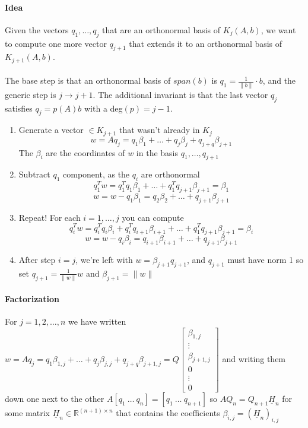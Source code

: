 \documentclass[10pt]{report}
\begin{document}
\paragraph{Idea} Given the vectors $q_1,\ldots,q_j$ that are an orthonormal basis of $K_j(A,b)$, we want to compute one more vector $q_{j+1}$ that extends it to an orthonormal basis of $K_{j+1}(A,b)$.\\\\
The base step is that an orthonormal basis of $span(b)$ is $q_1=\frac{1}{\|b\|}\cdot b$, and the generic step is $j\rightarrow j+1$. The additional invariant is that the last vector $q_j$ satisfies $q_j=p(A)b$ with a deg$(p)=j-1$.
\begin{enumerate}
	\item Generate a vector $\in K_{j+1}$ that wasn't already in $K_j$
	$$w = Aq_j = q_1\beta_1+\ldots + q_j\beta_j + q_{j+q}\beta_{j+1}$$
	The $\beta_i$ are the coordinates of $w$ in the basis $q_1,\ldots,q_{j+1}$
	\item Subtract $q_1$ component, as the $q_i$ are orthonormal
	$$q_1^Tw = q_1^Tq_1\beta_1+\ldots+q_1^Tq_{j+1}\beta_{j+1} = \beta_1$$
	$$w = w - q_1\beta_1 = q_2\beta_2 + \ldots + q_{j+1}\beta_{j+1}$$
	\item Repeat! For each $i=1,\ldots,j$ you can compute
	$$q_i^Tw = q_i^Tq_i\beta_i + q_i^Tq_{i+1}\beta_{i+1}+\ldots+q_1^Tq_{j+1}\beta_{j+1} = \beta_i$$
	$$w = w - q_i\beta_i = q_{i+1}\beta_{i+1} + \ldots + q_{j+1}\beta_{j+1}$$
	\item After step $i=j$, we're left with $w = \beta_{j+1}q_{j+1}$, and $q_{j+1}$ must have norm 1 so set $q_{j+1}=\frac{1}{\|w\|}w$ and $\beta_{j+1}= \|w\|$
\end{enumerate}
\paragraph{Factorization} For $j=1,2,\ldots,n$ we have written $w = Aq_j = q_1\beta_{1,j}+\ldots + q_j\beta_{j,j} + q_{j+q}\beta_{j+1,j} = Q\left[\begin{array}{c}
\beta_{1,j}\\\vdots\\\beta_{j+1,j}\\0\\\vdots\\0
\end{array}\right]$ and writing them down one next to the other $A[q_1\:\ldots\:q_n] = [q_1\:\ldots\:q_{n+1}]$ so $AQ_n = Q_{n+1}\underline{H}_n$ for some matrix $\underline{H}_n\in \mathbb{R}^{(n+1)\times n}$ that contains the coefficients $\beta_{i,j} = (\underline{H}_n)_{i,j}$
\end{document}
